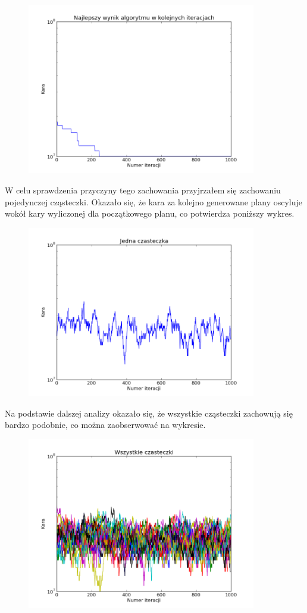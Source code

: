 \begin{figure}[H]
\includegraphics[width=10cm]{img/standard_penalty.png}
\centering
\end{figure}
\par W celu sprawdzenia przyczyny tego zachowania przyjrzałem się zachowaniu pojedynczej cząsteczki. Okazało się, że kara za kolejno generowane plany oscyluje wokół kary wyliczonej dla początkowego planu, co potwierdza poniższy wykres.  
\begin{figure}[H]
\includegraphics[width=10cm]{img/standard_particle.png}
\centering
\end{figure}
\par Na podstawie dalszej analizy okazało się, że wszystkie cząsteczki zachowują się bardzo podobnie, co można zaobserwować na wykresie. 
\begin{figure}[H]
\includegraphics[width=10cm]{img/standard_particle_all.png}
\centering
\end{figure}
